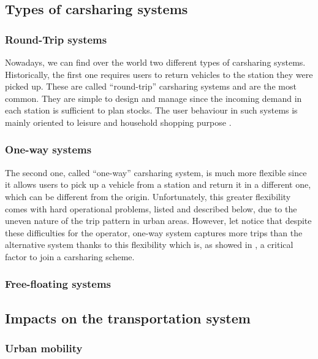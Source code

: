 \begin{bibunit}[ieeetr]
\subsection{Types of carsharing systems}

\subsubsection{Round-Trip systems}
Nowadays, we can find over the world two different types of carsharing systems.
Historically, the first one requires users to return vehicles to the station they were picked up.
These are called ``round-trip'' carsharing systems and are the most common.
They are simple to design and manage since the incoming demand in each station is sufficient to plan stocks.
The user behaviour in such systems is mainly oriented to leisure and household shopping purpose \cite{barth_shared_use_2002, costain_synopsis_2012}.

\subsubsection{One-way systems}
The second one, called ``one-way'' carsharing system, is much more flexible since it allows users to pick up a vehicle from a station and return it in a different one, which can be different from the origin.
Unfortunately, this greater flexibility comes with hard operational problems, listed and described below, due to the uneven nature of the trip pattern in urban areas.
However, let notice that despite these difficulties for the operator, one-way system captures more trips than the alternative system thanks to this flexibility which is, as showed in \cite{efthymiou_which_2012}, a critical factor to join a carsharing scheme.

\subsubsection{Free-floating systems}



\subsection{Impacts on the transportation system}
\subsubsection{Urban mobility}


\end{bibunit}
